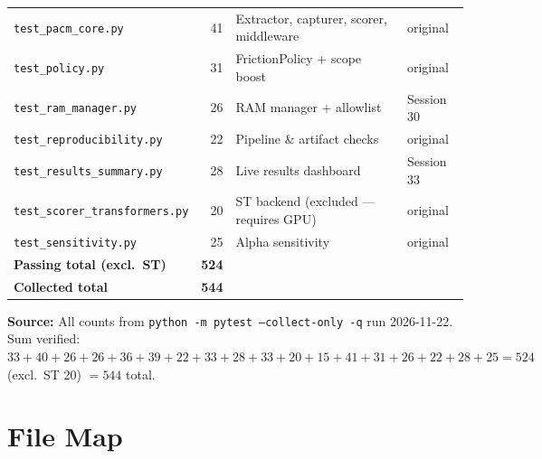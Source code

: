 \documentclass[11pt,letterpaper]{article}
\begin{document}
\begin{table}[htbp]
\begin{tabular}{lrll}
\texttt{test\_pacm\_core.py}               & 41 & Extractor, capturer, scorer, middleware     & original \\
\texttt{test\_policy.py}                    & 31 & FrictionPolicy + scope boost                & original \\
\texttt{test\_ram\_manager.py}             & 26 & RAM manager + allowlist                     & Session 30 \\
\texttt{test\_reproducibility.py}           & 22 & Pipeline \& artifact checks                 & original \\
\texttt{test\_results\_summary.py}          & 28 & Live results dashboard                      & Session 33 \\
\texttt{test\_scorer\_transformers.py}      & 20 & ST backend (excluded --- requires GPU)      & original \\
\texttt{test\_sensitivity.py}              & 25 & Alpha sensitivity                            & original \\
\midrule
\textbf{Passing total (excl.\ ST)}         & \textbf{524} & & \\
\textbf{Collected total}                   & \textbf{544} & & \\
\bottomrule
\end{tabular}
\end{table}

\noindent\textbf{Source:} All counts from \texttt{python -m pytest --collect-only -q}
run 2026-11-22. Sum verified: $33+40+26+26+36+39+22+33+28+33+20+15+41+31+26+22+28+25 = 524$
(excl.\ ST 20) $= 544$ total.

\section{File Map}
\label{app:files}
\end{document}
